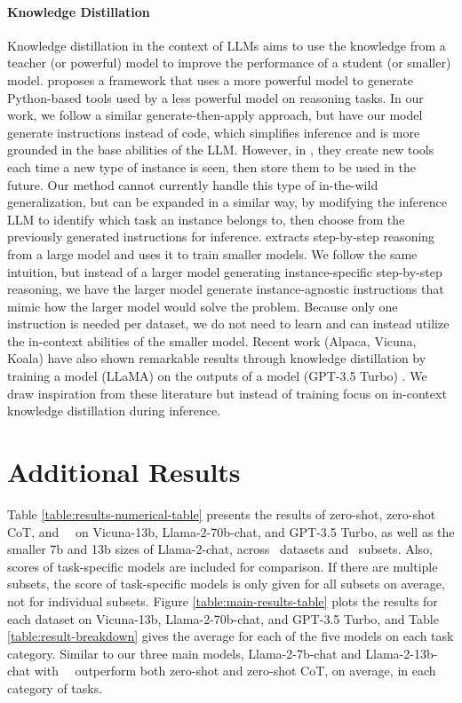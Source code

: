 \paragraph{Knowledge Distillation}
Knowledge distillation in the context of LLMs aims to use the knowledge from a teacher (or powerful) model to improve the performance of a student (or smaller) model.
\citet{cai2023large} proposes a framework that uses a more powerful model to generate Python-based tools used by a less powerful model on reasoning tasks. In our work, we follow a similar generate-then-apply approach, but have our model generate instructions instead of code, which simplifies inference and is more grounded in the base abilities of the LLM. However, in \citet{cai2023large}, they create new tools each time a new type of instance is seen, then store them to be used in the future. Our method cannot currently handle this type of in-the-wild generalization, but can be expanded in a similar way, by modifying the inference LLM to identify which task an instance belongs to, then choose from the previously generated instructions for inference.
\citet{hsieh2023distilling} extracts step-by-step reasoning from a large model and uses it to train smaller models. We follow the same intuition, but instead of a larger model generating instance-specific step-by-step reasoning, we have the larger model generate instance-agnostic instructions that mimic how the larger model would solve the problem. Because only one instruction is needed per dataset, we do not need to learn and can instead utilize the in-context abilities of the smaller model.
Recent work (Alpaca, Vicuna, Koala) have also shown remarkable results through knowledge distillation by training a model (LLaMA) on the outputs of a model (GPT-3.5 Turbo) \citep{alpaca2023, vicuna2023, koala2023}. We draw inspiration from these literature but instead of training focus on in-context knowledge distillation during inference.

\section{Additional Results}
\label{sec:additional-results}
Table \ref{table:results-numerical-table} presents the results of zero-shot, zero-shot CoT, and \zeroshotmid\ \method\ on Vicuna-13b, Llama-2-70b-chat, and GPT-3.5 Turbo, as well as the smaller 7b and 13b sizes of Llama-2-chat, across \NumDatasets\ datasets and \NumSubsets\ subsets. Also, scores of task-specific models are included for comparison. If there are multiple subsets, the score of task-specific models is only given for all subsets on average, not for individual subsets. Figure \ref{table:main-results-table} plots the results for each dataset on Vicuna-13b, Llama-2-70b-chat, and GPT-3.5 Turbo, and Table \ref{table:result-breakdown} gives the average for each of the five models on each task category. Similar to our three main models, Llama-2-7b-chat and Llama-2-13b-chat with \zeroshotmid\ \method\ outperform both zero-shot and zero-shot CoT, on average, in each category of tasks.


